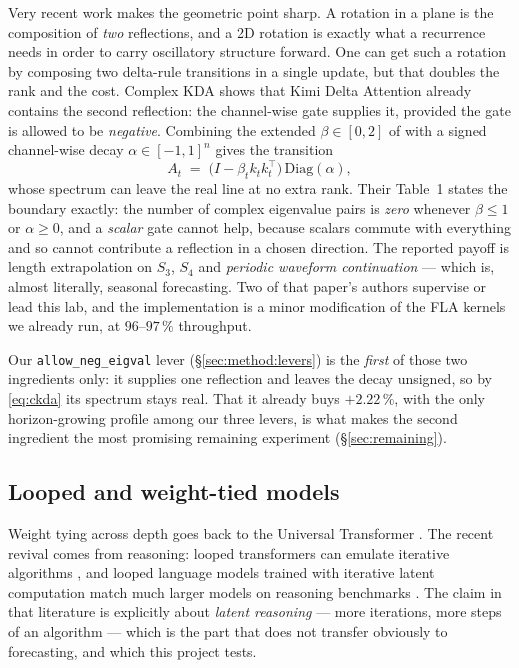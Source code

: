 Very recent work makes the geometric point sharp. A rotation in a plane is the
composition of \emph{two} reflections, and a 2D rotation is exactly what a
recurrence needs in order to carry oscillatory structure forward. One can get
such a rotation by composing two delta-rule transitions in a single update, but
that doubles the rank and the cost. Complex KDA \citep{ckda2026} shows that
Kimi Delta Attention already contains the second reflection: the channel-wise
gate supplies it, provided the gate is allowed to be \emph{negative}. Combining
the extended $\beta \in [0,2]$ of \citet{grazzi2025unlocking} with a signed
channel-wise decay $\alpha \in [-1,1]^n$ gives the transition
\begin{equation}
  A_t \;=\; \bigl(I - \beta_t k_t k_t^{\!\top}\bigr)\,\mathrm{Diag}(\alpha),
  \label{eq:ckda}
\end{equation}
whose spectrum can leave the real line at no extra rank. Their Table~1 states
the boundary exactly: the number of complex eigenvalue pairs is \emph{zero}
whenever $\beta \le 1$ or $\alpha \ge 0$, and a \emph{scalar} gate cannot help,
because scalars commute with everything and so cannot contribute a reflection
in a chosen direction. The reported payoff is length extrapolation on $S_3$,
$S_4$ and \emph{periodic waveform continuation} --- which is, almost literally,
seasonal forecasting. Two of that paper's authors supervise or lead this lab,
and the implementation is a minor modification of the FLA kernels we already
run, at $96$--$97\,\%$ throughput.

Our \texttt{allow\_neg\_eigval} lever (\S\ref{sec:method:levers}) is the
\emph{first} of those two ingredients only: it supplies one reflection and
leaves the decay unsigned, so by \eqref{eq:ckda} its spectrum stays real. That
it already buys $+2.22\,\%$, with the only horizon-growing profile among our
three levers, is what makes the second ingredient the most promising remaining
experiment (\S\ref{sec:remaining}).

\subsection{Looped and weight-tied models}

Weight tying across depth goes back to the Universal Transformer
\citep{dehghani2019universal}. The recent revival comes from reasoning: looped
transformers can emulate iterative algorithms \citep{giannou2023looped}, and
looped language models trained with iterative latent computation match much
larger models on reasoning benchmarks \citep{zhu2026ouro}. The claim in that
literature is explicitly about \emph{latent reasoning} --- more iterations,
more steps of an algorithm --- which is the part that does not transfer
obviously to forecasting, and which this project tests.

